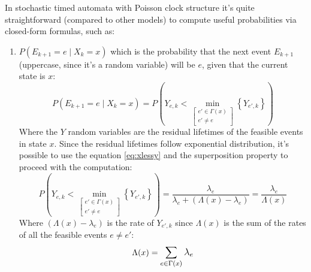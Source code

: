 \documentclass[12pt,a4paper]{article}
\begin{document}
\bigskip
\noindent
In stochastic timed automata with Poisson clock structure it's quite straightforward (compared to other models) to compute useful probabilities via closed-form formulas, such as:
\begin{enumerate}
\item $P(E_{k+1}=e \mid X_k=x)$ which is the probability that the next event $E_{k+1}$ (uppercase, since it's a random variable) will be $e$, given that the current state is $x$:
$$
P(E_{k+1}=e \mid X_k=x)=P\left(Y_{e,k} <
\min_{\left[
\begin{matrix}
e'\in \Gamma(x) \\
e'\neq e
\end{matrix}
\right]}
\left\lbrace Y_{e',k}\right\rbrace \right)
$$
Where the $Y$ random variables are the residual lifetimes of the feasible events in state $x$. Since the residual lifetimes follow exponential distribution, it's possible to use the equation \ref{eq:xlessy} and the superposition property to proceed with the computation:
\begin{equation}
\label{eq:inxnextstateise}
P\left(Y_{e,k} <
\min_{\left[
\begin{matrix}
e'\in \Gamma(x) \\
e'\neq e
\end{matrix}
\right]}
\left\lbrace Y_{e',k}\right\rbrace \right)
=\frac{\lambda_e}{\lambda_e+(\Lambda(x)-\lambda_e)}=\frac{\lambda_e}{\Lambda(x)}
\end{equation}
\noindent
Where $(\Lambda(x)-\lambda_e)$ is the rate of $Y_{e',k}$ since $\Lambda(x)$ is the sum of the rates of all the feasible events $e \neq e'$:
$$
\Lambda(x) = \mathlarger{\sum_{e \in \Gamma(x)}\lambda_e}
$$


\end{enumerate}
\end{document}
